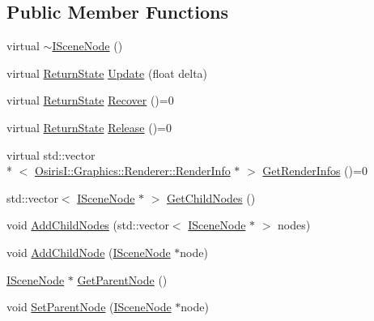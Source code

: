 \subsection*{Public Member Functions}
\begin{DoxyCompactItemize}
\item 
virtual \hyperlink{class_osiris_i_1_1_graphics_1_1_scenes_1_1_i_scene_node_a4c2f1463d90641f58d487f30bba2aab2}{$\sim$\-I\-Scene\-Node} ()
\item 
virtual \hyperlink{namespace_osiris_i_a8f53bf938dc75c65c6a529694514013e}{Return\-State} \hyperlink{class_osiris_i_1_1_graphics_1_1_scenes_1_1_i_scene_node_ade65f270c5d795fa0709c9982002ee4e}{Update} (float delta)
\item 
virtual \hyperlink{namespace_osiris_i_a8f53bf938dc75c65c6a529694514013e}{Return\-State} \hyperlink{class_osiris_i_1_1_graphics_1_1_scenes_1_1_i_scene_node_add003f867ff45240dc09f03df9f0488d}{Recover} ()=0
\item 
virtual \hyperlink{namespace_osiris_i_a8f53bf938dc75c65c6a529694514013e}{Return\-State} \hyperlink{class_osiris_i_1_1_graphics_1_1_scenes_1_1_i_scene_node_ad6ce3194e1a91ecc8492089fa36f3303}{Release} ()=0
\item 
virtual std\-::vector\\*
$<$ \hyperlink{struct_osiris_i_1_1_graphics_1_1_renderer_1_1_render_info}{Osiris\-I\-::\-Graphics\-::\-Renderer\-::\-Render\-Info} $\ast$ $>$ \hyperlink{class_osiris_i_1_1_graphics_1_1_scenes_1_1_i_scene_node_aeda7537b2a882f8b00d418822b7726f4}{Get\-Render\-Infos} ()=0
\item 
std\-::vector$<$ \hyperlink{class_osiris_i_1_1_graphics_1_1_scenes_1_1_i_scene_node}{I\-Scene\-Node} $\ast$ $>$ \hyperlink{class_osiris_i_1_1_graphics_1_1_scenes_1_1_i_scene_node_ae6df7bbc8deb18f6de19935a8cb576e8}{Get\-Child\-Nodes} ()
\item 
void \hyperlink{class_osiris_i_1_1_graphics_1_1_scenes_1_1_i_scene_node_a5976beff85bc98a7626938e03c7b4586}{Add\-Child\-Nodes} (std\-::vector$<$ \hyperlink{class_osiris_i_1_1_graphics_1_1_scenes_1_1_i_scene_node}{I\-Scene\-Node} $\ast$ $>$ nodes)
\item 
void \hyperlink{class_osiris_i_1_1_graphics_1_1_scenes_1_1_i_scene_node_a31a13d8ddc95ab388cadf487557428bc}{Add\-Child\-Node} (\hyperlink{class_osiris_i_1_1_graphics_1_1_scenes_1_1_i_scene_node}{I\-Scene\-Node} $\ast$node)
\item 
\hyperlink{class_osiris_i_1_1_graphics_1_1_scenes_1_1_i_scene_node}{I\-Scene\-Node} $\ast$ \hyperlink{class_osiris_i_1_1_graphics_1_1_scenes_1_1_i_scene_node_a9a1c72462362c9d0e76ca7955ac0e57f}{Get\-Parent\-Node} ()
\item 
void \hyperlink{class_osiris_i_1_1_graphics_1_1_scenes_1_1_i_scene_node_abeaa20d1c816f40ca8d4aafb3ee225d6}{Set\-Parent\-Node} (\hyperlink{class_osiris_i_1_1_graphics_1_1_scenes_1_1_i_scene_node}{I\-Scene\-Node} $\ast$node)
\end{DoxyCompactItemize}
